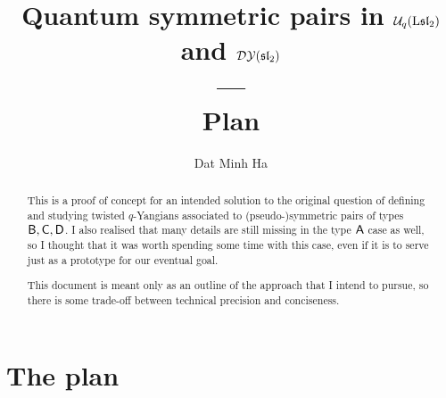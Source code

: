 

\setcounter{section}{0}


\renewcommand{\1}{\boldsymbol{\delta}}



    \title{
        Quantum symmetric pairs in $\mathcal{U}_q(\mathrm{L}\mathfrak{sl}_2)$ and $\mathcal{DY}(\mathfrak{sl}_2)$
        \\
        ---
        \\
        Plan
    }
    
    \author{Dat Minh Ha}
    \maketitle

    \begin{abstract}
        This is a proof of concept for an intended solution to the original question of defining and studying twisted $q$-Yangians associated to (pseudo-)symmetric pairs of types $\mathsf{B}, \mathsf{C}, \mathsf{D}$. I also realised that many details are still missing in the type $\mathsf{A}$ case as well, so I thought that it was worth spending some time with this case, even if it is to serve just as a prototype for our eventual goal.
        
        This document is meant only as an outline of the approach that I intend to pursue, so there is some trade-off between technical precision and conciseness. 
    \end{abstract}
    
    {
    \hypersetup{} 
    \tableofcontents %
    }

    \section{The plan}
